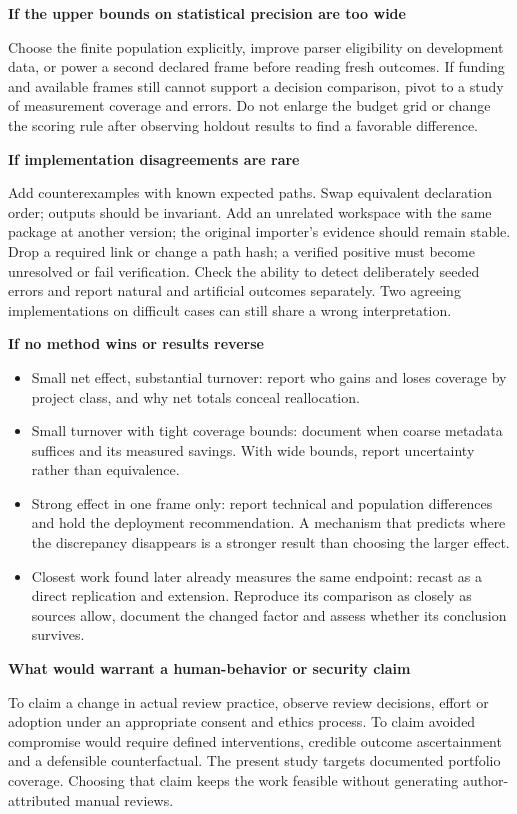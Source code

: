 \documentclass[11pt,a4paper]{article}
\newcommand{\hd}[1]{\par\textbf{\color{accent}#1}\par\nopagebreak}
\begin{document}
\hd{If the upper bounds on statistical precision are too wide}
Choose the finite population explicitly, improve parser eligibility on development data, or power a second declared frame before reading fresh outcomes. If funding and available frames still cannot support a decision comparison, pivot to a study of measurement coverage and errors. Do not enlarge the budget grid or change the scoring rule after observing holdout results to find a favorable difference.

\hd{If implementation disagreements are rare}
Add counterexamples with known expected paths. Swap equivalent declaration order; outputs should be invariant. Add an unrelated workspace with the same package at another version; the original importer's evidence should remain stable. Drop a required link or change a path hash; a verified positive must become unresolved or fail verification. Check the ability to detect deliberately seeded errors and report natural and artificial outcomes separately. Two agreeing implementations on difficult cases can still share a wrong interpretation.

\hd{If no method wins or results reverse}
\begin{itemize}
\item Small net effect, substantial turnover: report who gains and loses coverage by project class, and why net totals conceal reallocation.
\item Small turnover with tight coverage bounds: document when coarse metadata suffices and its measured savings. With wide bounds, report uncertainty rather than equivalence.
\item Strong effect in one frame only: report technical and population differences and hold the deployment recommendation. A mechanism that predicts where the discrepancy disappears is a stronger result than choosing the larger effect.
\item Closest work found later already measures the same endpoint: recast as a direct replication and extension. Reproduce its comparison as closely as sources allow, document the changed factor and assess whether its conclusion survives.
\end{itemize}
\hd{What would warrant a human-behavior or security claim}
To claim a change in actual review practice, observe review decisions, effort or adoption under an appropriate consent and ethics process. To claim avoided compromise would require defined interventions, credible outcome ascertainment and a defensible counterfactual. The present study targets documented portfolio coverage. Choosing that claim keeps the work feasible without generating author-attributed manual reviews.
\end{document}

